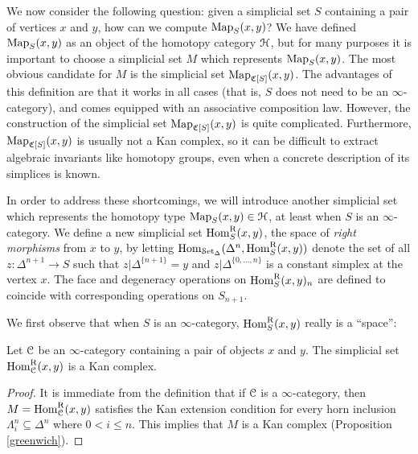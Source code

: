 We now consider the following question: given a simplicial set $S$ containing a pair of vertices $x$ and $y$, how can we compute $\operatorname{{Map}}_{S}(x,y)$? We have defined
$\operatorname{{Map}}_{S}(x,y)$ as an object of the homotopy category $\operatorname{\mathcal{H}}$, but for many purposes it is important to choose a simplicial set $M$ which represents $\operatorname{{Map}}_{S}(x,y)$. 
The most obvious candidate for $M$ is the simplicial set
$\operatorname{{Map}}_{\operatorname{\mathfrak{C}}[S]}(x,y)$. The advantages of this definition are that it works in all cases (that is, $S$ does not need to be an $\infty$-category), and comes equipped with an associative composition law. However, the construction of the simplicial set
$\operatorname{{Map}}_{\operatorname{\mathfrak{C}}[S]}(x,y)$ is quite complicated. Furthermore,
$\operatorname{{Map}}_{\operatorname{\mathfrak{C}}[S]}(x,y)$ is usually not a Kan complex, so it
can be difficult to extract algebraic invariants like homotopy
groups, even when a concrete description of its simplices is known. 

In order to address these shortcomings, we will introduce another simplicial set which
represents the homotopy type $\operatorname{{Map}}_{S}(x,y) \in \operatorname{\mathcal{H}}$, at least when $S$ is an $\infty$-category. 
We define a new simplicial
set $\operatorname{Hom}^{\operatorname{R}}_S(x,y)$, the space of {\it right morphisms} from
$x$ to $y$, by letting $\operatorname{Hom}_{\operatorname{\mathcal{S}et_{\Delta}}}( \Delta^n, \operatorname{Hom}^{\operatorname{R}}_S(x,y))$ denote the set of
all $z: \Delta^{n+1} \rightarrow S$ such that $z| \Delta^{ \{n+1 \}} = y$ and $z|
\Delta^{ \{0, \ldots, n\} }$ is a constant simplex at the vertex
$x$. The face and degeneracy operations on
$\operatorname{Hom}^{\operatorname{R}}_S(x,y)_n$ are defined to coincide with corresponding operations on 
$S_{n+1}$.

We first observe that when $S$ is an $\infty$-category, $\operatorname{Hom}^{\operatorname{R}}_S(x,y)$ really is a ``space'':

\begin{proposition}\label{gura}
Let $\operatorname{\mathcal{C}}$ be an $\infty$-category containing a pair of objects $x$ and $y$. The simplicial set
$\operatorname{Hom}^{\operatorname{R}}_{\operatorname{\mathcal{C}}}(x,y)$ is a Kan complex.
\end{proposition}

\begin{proof}
It is immediate from the definition that if $\operatorname{\mathcal{C}}$ is a
$\infty$-category, then $M=\operatorname{Hom}^{\operatorname{R}}_{\operatorname{\mathcal{C}}}(x,y)$ satisfies the Kan
extension condition for every horn inclusion $\Lambda^n_i
\subseteq \Delta^n$ where $0 < i \leq n$. This implies that $M$ is
a Kan complex (Proposition \ref{greenwich}).
\end{proof}

